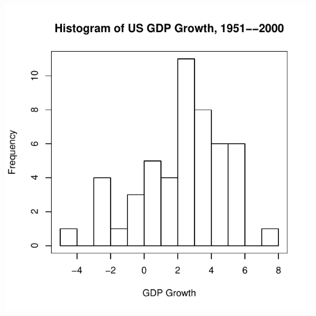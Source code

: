 \documentclass[pdflatex,landscape,titlepage]{foils}
\begin{document}
\begin{center}

\includegraphics[width=7.5 in]{gdphist_all}

\end{center}
\end{document}
